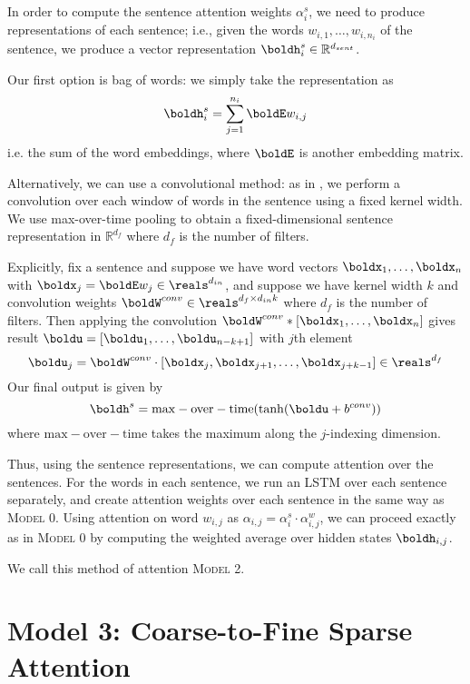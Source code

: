 \documentclass[11pt]{report}
\begin{document}
In order to compute the sentence attention weights $\alpha_i^s$, we need to produce representations of each sentence; i.e., given the words $w_{i,1}, \ldots, w_{i, n_i}$ of the sentence, we produce a vector representation $\boldh^s_i \in \mathbb{R}^{d_{sent}}$.

Our first option is bag of words: we simply take the representation as
\begin{equation}
\boldh_i^s = \sum_{j=1}^{n_i} \boldE w_{i,j}
\end{equation}
i.e. the sum of the word embeddings, where $\boldE$ is another embedding matrix.

Alternatively, we can use a convolutional method: as in \citet{kim2014convolutional}, we perform a convolution over each window of words in the sentence using a fixed kernel width. We use max-over-time pooling to obtain a fixed-dimensional sentence representation in $\mathbb{R}^{d_f}$ where $d_f$ is the number of filters.

Explicitly, fix a sentence and suppose we have word vectors $\boldx_1, \ldots, \boldx_n$ with $\boldx_j = \boldE w_j \in \reals^{d_{in}}$, and suppose we have kernel width $k$ and convolution weights $\boldW^{conv} \in \reals^{d_f \times d_{in} k}$ where $d_f$ is the number of filters. Then applying the convolution
$\boldW^{conv} * [\boldx_1, \ldots, \boldx_n]$ gives result $\boldu = [\boldu_1, \ldots, \boldu_{n-k+1}]$ with $j$th element
$$\boldu_j = \boldW^{conv} \cdot [\boldx_j, \boldx_{j+1}, \ldots, \boldx_{j+k-1}] \in \reals^{d_f}$$
Our final output is given by 
\begin{equation}
\boldh^s = \mathrm{max-over-time}(\tanh(\boldu + b^{conv}))
\end{equation}
where $\mathrm{max-over-time}$ takes the maximum along the $j$-indexing dimension.


Thus, using the sentence representations, we can compute attention over the sentences.
For the words in each sentence, we run an LSTM over each sentence separately, and create attention weights over each sentence in the same way as \textsc{Model 0}. Using attention on word $w_{i,j}$ as  $\alpha_{i,j} = \alpha_i^s \cdot \alpha_{i,j}^w$, we can proceed exactly as in \textsc{Model 0} by computing the weighted average over hidden states $\boldh_{i,j}$.

We call this method of attention \textsc{Model 2}.

\section{Model 3: Coarse-to-Fine Sparse Attention}
\end{document}
